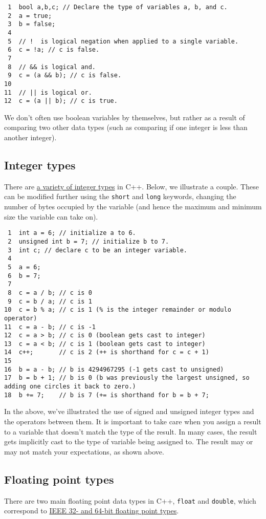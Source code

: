 \documentclass[11pt]{article}
\begin{document}
\begin{verbatim}
 1  bool a,b,c; // Declare the type of variables a, b, and c.
 2  a = true;
 3  b = false;
 4  
 5  // !  is logical negation when applied to a single variable.
 6  c = !a; // c is false.
 7  
 8  // && is logical and.
 9  c = (a && b); // c is false.
10  
11  // || is logical or.
12  c = (a || b); // c is true.
\end{verbatim}

We don't often use boolean variables by themselves, but rather as a result 
of comparing two other data types (such as comparing if one integer is less 
than another integer).

\subsection{Integer types}
\label{sec-3-2}

There are \href{http://en.cppreference.com/w/cpp/language/types}{a variety of integer types} in C++. Below, we illustrate a 
couple. These can be modified further using the \texttt{short} and \texttt{long} 
keywords, changing the number of bytes occupied by the variable (and 
hence the maximum and minimum size the variable can take on).

\begin{verbatim}
 1  int a = 6; // initialize a to 6.
 2  unsigned int b = 7; // initialize b to 7.
 3  int c; // declare c to be an integer variable.
 4  
 5  a = 6;
 6  b = 7;
 7  
 8  c = a / b; // c is 0
 9  c = b / a; // c is 1
10  c = b % a; // c is 1 (% is the integer remainder or modulo operator)
11  c = a - b; // c is -1
12  c = a > b; // c is 0 (boolean gets cast to integer)
13  c = a < b; // c is 1 (boolean gets cast to integer)
14  c++;       // c is 2 (++ is shorthand for c = c + 1)
15  
16  b = a - b; // b is 4294967295 (-1 gets cast to unsigned)
17  b = b + 1; // b is 0 (b was previously the largest unsigned, so adding one circles it back to zero.)
18  b += 7;    // b is 7 (+= is shorthand for b = b + 7;
\end{verbatim}

In the above, we've illustrated the use of signed and unsigned 
integer types and the operators between them. It is important to 
take care when you assign a result to a variable that doesn't match 
the type of the result. In many cases, the result gets implicitly 
cast to the type of variable being assigned to. The result may or 
may not match your expectations, as shown above.

\subsection{Floating point types}
\label{sec-3-3}
There are two main floating point data types in C++, \texttt{float} and \texttt{double},
which correspond to \href{https://en.wikipedia.org/wiki/IEEE_floating_point}{IEEE 32- and 64-bit floating point types}. 
\end{document}
